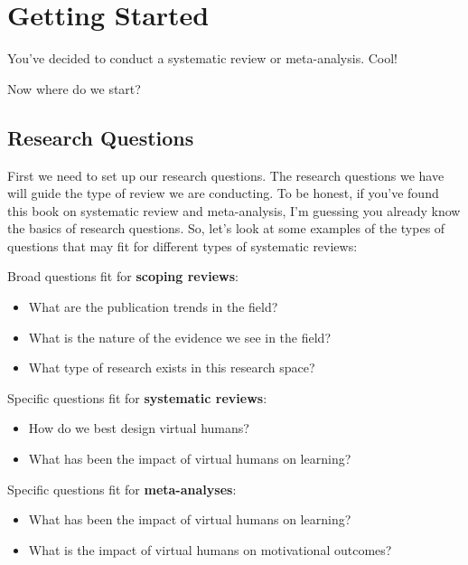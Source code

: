 \documentclass[
]{book}
\begin{document}
\hypertarget{getting-started}{%
\chapter{Getting Started}\label{getting-started}}

You've decided to conduct a systematic review or meta-analysis. Cool!

Now where do we start?

\hypertarget{research-questions}{%
\section{Research Questions}\label{research-questions}}

First we need to set up our research questions. The research questions we have will guide the type of review we are conducting. To be honest, if you've found this book on systematic review and meta-analysis, I'm guessing you already know the basics of research questions. So, let's look at some examples of the types of questions that may fit for different types of systematic reviews:

Broad questions fit for \textbf{scoping reviews}:

\begin{itemize}
\item
  What are the publication trends in the field?
\item
  What is the nature of the evidence we see in the field?
\item
  What type of research exists in this research space?
\end{itemize}

Specific questions fit for \textbf{systematic reviews}:

\begin{itemize}
\item
  How do we best design virtual humans?
\item
  What has been the impact of virtual humans on learning?
\end{itemize}

Specific questions fit for \textbf{meta-analyses}:

\begin{itemize}
\item
  What has been the impact of virtual humans on learning?
\item
  What is the impact of virtual humans on motivational outcomes?
\end{itemize}
\end{document}
